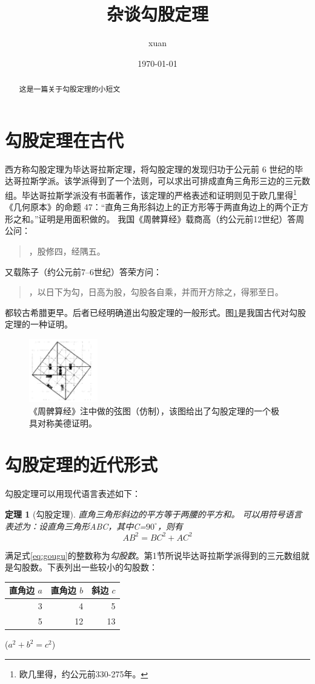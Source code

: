 \documentclass[UTF8]{ctexart}
\title{杂谈勾股定理}
\author{xuan}
\date{\today}
\newtheorem{thm}{定理}
\begin{document}
\maketitle
\begin{abstract}
这是一篇关于勾股定理的小短文
\end{abstract}
\tableofcontents
\section{勾股定理在古代}
西方称勾股定理为毕达哥拉斯定理，将勾股定理的发现归功于公元前 6 世纪的毕达哥拉斯学派\cite{Kline}。该学派得到了一个法则，可以求出可排成直角三角形三边的三元数组。毕达哥拉斯学派没有书面著作，该定理的严格表述和证明则见于欧几里得\footnote{欧几里得，约公元前330-275年。}《几何原本》的命题 47：“直角三角形斜边上的正方形等于两直角边上的两个正方形之和。”证明是用面积做的。
我国《周髀算经》载商高（约公元前12世纪）答周公问：
\begin{quote}
，股修四，经隅五。
\end{quote}
又载陈子（约公元前7--6世纪）答荣方问：
\begin{quote}
，以日下为勾，日高为股，勾股各自乘，并而开方除之，得邪至日。
\end{quote}
都较古希腊更早。后者已经明确道出勾股定理的一般形式。图\ref{fig:gougu}是我国古代对勾股定理的一种证明\cite{quanjing}。 
\begin{figure}[ht]
  \centering
  \includegraphics[width=3cm]{gougu.png}
  \caption{《周髀算经》注中做的弦图（仿制），该图给出了勾股定理的一个极具对称美德证明。}
  \label{fig:gougu}
\end{figure}


\section{勾股定理的近代形式}
勾股定理可以用现代语言表述如下：
\begin{thm}[勾股定理]
直角三角形斜边的平方等于两腰的平方和。
可以用符号语言表述为：设直角三角形ABC，其中\angle C=$90^\circ$，则有
\begin{equation} \label{eq:gougu}
AB^2 = BC^2 + AC^2
\end{equation}
\end{thm}

满足式\eqref{eq:gougu}的整数称为\emph{勾股数}。第1节所说毕达哥拉斯学派得到的三元数组就是勾股数。下表列出一些较小的勾股数：
\begin{table}[h]
\begin{tabular}{|rrr|}
\hline
直角边 $a$ & 直角边 $b$ & 斜边 $c$\\
\hline
3 &  4 & 5\\
5 &  12&  13\\
\hline
\end{tabular}%
\qquad
($a^2 + b^2 = c^2$)
\end{table}
\nocite{Shiye}

\end{document}

